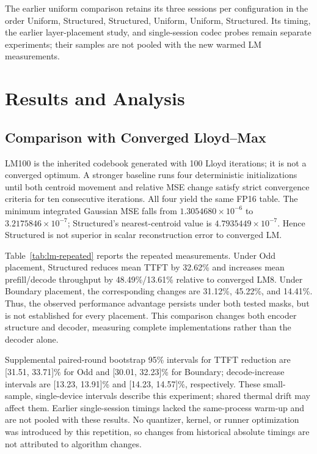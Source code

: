 \documentclass[conference,a4paper,10pt]{IEEEtran}
\begin{document}
The earlier uniform comparison retains its three sessions per configuration in the order Uniform, Structured, Structured, Uniform, Uniform, Structured. Its timing, the earlier layer-placement study, and single-session codec probes remain separate experiments; their samples are not pooled with the new warmed LM measurements.

\section{Results and Analysis}
\subsection{Comparison with Converged Lloyd--Max}
LM100 is the inherited codebook generated with 100 Lloyd iterations; it is not a converged optimum. A stronger baseline runs four deterministic initializations until both centroid movement and relative MSE change satisfy strict convergence criteria for ten consecutive iterations. All four yield the same FP16 table. The minimum integrated Gaussian MSE falls from $1.3054680\!\times\!10^{-6}$ to $3.2175846\!\times\!10^{-7}$; Structured's nearest-centroid value is $4.7935449\!\times\!10^{-7}$. Hence Structured is not superior in scalar reconstruction error to converged LM.



Table~\ref{tab:lm-repeated} reports the repeated measurements. Under Odd placement, Structured reduces mean TTFT by 32.62\% and increases mean prefill/decode throughput by 48.49\%/13.61\% relative to converged LM8. Under Boundary placement, the corresponding changes are 31.12\%, 45.22\%, and 14.41\%. Thus, the observed performance advantage persists under both tested masks, but is not established for every placement. This comparison changes both encoder structure and decoder, measuring complete implementations rather than the decoder alone.

Supplemental paired-round bootstrap 95\% intervals for TTFT reduction are [31.51, 33.71]\% for Odd and [30.01, 32.23]\% for Boundary; decode-increase intervals are [13.23, 13.91]\% and [14.23, 14.57]\%, respectively. These small-sample, single-device intervals describe this experiment; shared thermal drift may affect them. Earlier single-session timings lacked the same-process warm-up and are not pooled with these results. No quantizer, kernel, or runner optimization was introduced by this repetition, so changes from historical absolute timings are not attributed to algorithm changes.
\end{document}
